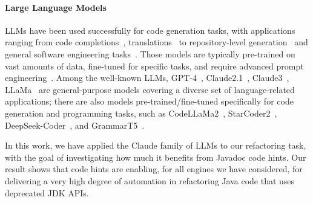 \documentclass[conference]{IEEEtran}
\begin{document}
\paragraph{Large Language Models}
%
LLMs have been used successfully for code generation tasks,
with applications ranging from code
completions~\cite{llmsforcodecompletion,ni2023lever,codegenclasslevel,Ding2024cocomic},
translations~\cite{tang-etal-2023-explain,lostintranslation} to
repository-level generation~\cite{zhang2023repocoder} and general software
engineering tasks~\cite{yang2024sweagent}.  Those models are typically
pre-trained on vast amounts of data, fine-tuned for specific tasks, and
require advanced prompt engineering~\cite{jiang2024survey}. 
Among the well-known LLMs, GPT-4~\cite{openai2024gpt4}, Claude2.1~\cite{claude},
Claude3~\cite{claude}, LLaMa~\cite{touvron2023llama} are general-purpose
models covering a diverse set of language-related applications; there are
also models pre-trained/fine-tuned specifically for code generation and
programming tasks, such as CodeLLaMa2~\cite{roziere2024code},
StarCoder2~\cite{lozhkov2024starcoder},
DeepSeek-Coder~\cite{guo2024deepseekcoder}, and GrammarT5~\cite{grammart5}.


In this work, we have applied the Claude family of LLMs to our refactoring
task, with the goal of investigating how much it benefits from Javadoc code
hints.  Our result shows that code hints are enabling, for all engines we
have considered, for delivering a very high degree of automation in
refactoring Java code that uses deprecated JDK APIs.


\end{document}
